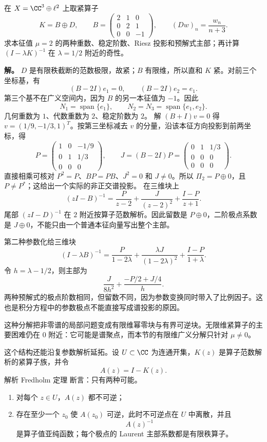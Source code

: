 \begin{exbox}
在 $X=\CC^3\oplus\ell^2$ 上取紧算子
\[
K=B\oplus D,\qquad
B=\begin{pmatrix}2&1&0\\0&2&1\\0&0&-1\end{pmatrix},
\qquad (Dw)_n=\frac{w_n}{n+3}.
\]
求本征值 $\mu=2$ 的两种重数、稳定阶数、Riesz 投影和预解式主部；再计算 $(I-\lambda K)^{-1}$ 在 $\lambda=1/2$ 附近的奇性。

\textbf{解。} $D$ 是有限秩截断的范数极限，故紧；$B$ 有限维，所以直和 $K$ 紧。对前三个坐标基，有
\[
(B-2I)e_1=0,\qquad(B-2I)e_2=e_1.
\]
第三个基不在广义空间内，因为 $B$ 的另一本征值为 $-1$。因此
\[
N_1=\operatorname{span}\{e_1\},\qquad
N_2=N_3=\operatorname{span}\{e_1,e_2\}.
\]
几何重数为 $1$、代数重数为 $2$、稳定阶数为 $2$。
解 $(B+I)v=0$ 得 $v=(1/9,-1/3,1)^T$。按第三坐标减去 $v$ 的分量，沿该本征方向投影到前两坐标，得
\[
P=\begin{pmatrix}1&0&-1/9\\0&1&1/3\\0&0&0\end{pmatrix},
\qquad
J=(B-2I)P=\begin{pmatrix}0&1&1/3\\0&0&0\\0&0&0\end{pmatrix}.
\]
直接相乘可核对 $P^2=P$、$BP=PB$、$J^2=0$ 和 $J\ne0$。所以 $\Pi_2=P\oplus0$，且 $P\ne P^*$；这给出一个实际的非正交谱投影。
在三维块上
\[
(zI-B)^{-1}
=\frac{P}{z-2}+\frac{J}{(z-2)^2}+\frac{I-P}{z+1}.
\]
尾部 $(zI-D)^{-1}$ 在 $2$ 附近按算子范数解析。因此留数是 $P\oplus0$，二阶极点系数是 $J\oplus0$，不能只由一个普通本征向量写出整个主部。

第二种参数化给三维块
\[
(I-\lambda B)^{-1}
=\frac{P}{1-2\lambda}
+\frac{\lambda J}{(1-2\lambda)^2}
+\frac{I-P}{1+\lambda}.
\]
令 $h=\lambda-1/2$，则主部为
\[
\frac{J}{8h^2}
+\frac{-P/2+J/4}{h}.
\]
两种预解式的极点阶数相同，但留数不同，因为参数变换同时带入了比例因子。这也是积分方程中的参数极点不能直接写成谱投影的原因。
\end{exbox}

这种分解把非零谱的局部问题变成有限维幂零块与有界可逆块。无限维紧算子的主要困难仍在 $0$ 附近：它可能是谱聚点，而本节的有限维广义分解只针对 $\mu\ne0$。


这个结构还能沿复参数解析延拓。设 $U\subset\CC$ 为连通开集，$K(z)$ 是算子范数解析的紧算子族，并令
\[
A(z)=I-K(z).
\]
解析 Fredholm 定理 断言：只有两种可能。
\begin{enumerate}[label=(\roman*)]
\item 对每个 $z\in U$，$A(z)$ 都不可逆；
\item 存在至少一个 $z_0$ 使 $A(z_0)$ 可逆，此时不可逆点在 $U$ 中离散，并且
\begin{equation*}A(z)^{-1}\end{equation*}
是算子值亚纯函数；每个极点的 Laurent 主部系数都是有限秩算子。
\end{enumerate}

